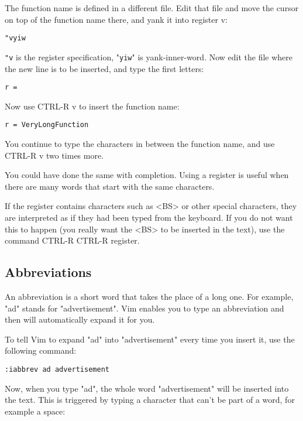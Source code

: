 The function name is defined in a different file.
Edit that file and move the cursor on top of the function name there, and yank it into register v:

\begin{Verbatim}[samepage=true]
 "vyiw
\end{Verbatim}

\verb!"v! is the register specification, "\verb!yiw!" is yank-inner-word.
Now edit the file where the new line is to be inserted, and type the first letters:

\begin{Verbatim}[samepage=true]
    r = 
\end{Verbatim}

Now use CTRL-R v to insert the function name:

\begin{Verbatim}[samepage=true]
    r = VeryLongFunction 
\end{Verbatim}

You continue to type the characters in between the function name, and use CTRL-R v two times more.

You could have done the same with completion.
Using a register is useful when there are many words that start with the same characters.

If the register contains characters such as <BS> or other special characters, they are interpreted as if they had been typed from the keyboard.
If you do not want this to happen (you really want the <BS> to be inserted in the text), use the command CTRL-R CTRL-R {register}.
\subsection{Abbreviations}
An abbreviation is a short word that takes the place of a long one.
For example, "ad" stands for "advertisement".
Vim enables you to type an abbreviation and then will automatically expand it for you.

To tell Vim to expand "ad" into "advertisement" every time you insert it, use the following command:

\begin{Verbatim}[samepage=true]
 :iabbrev ad advertisement
\end{Verbatim}

Now, when you type "ad", the whole word "advertisement" will be inserted into the text.
This is triggered by typing a character that can't be part of a word, for example a space:

